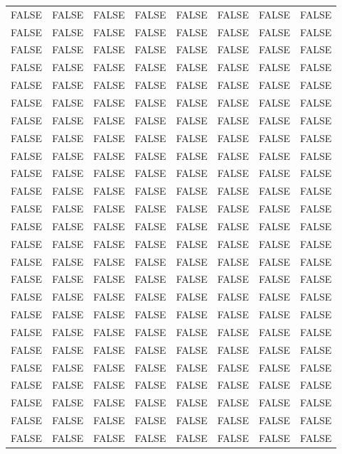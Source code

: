 \documentclass[11pt]{article}
\begin{document}
\begin{tabular}{llllllll}
	 FALSE & FALSE & FALSE & FALSE & FALSE & FALSE & FALSE & FALSE\\
	 FALSE & FALSE & FALSE & FALSE & FALSE & FALSE & FALSE & FALSE\\
	 FALSE & FALSE & FALSE & FALSE & FALSE & FALSE & FALSE & FALSE\\
	 FALSE & FALSE & FALSE & FALSE & FALSE & FALSE & FALSE & FALSE\\
	 FALSE & FALSE & FALSE & FALSE & FALSE & FALSE & FALSE & FALSE\\
	 FALSE & FALSE & FALSE & FALSE & FALSE & FALSE & FALSE & FALSE\\
	 FALSE & FALSE & FALSE & FALSE & FALSE & FALSE & FALSE & FALSE\\
	 FALSE & FALSE & FALSE & FALSE & FALSE & FALSE & FALSE & FALSE\\
	 FALSE & FALSE & FALSE & FALSE & FALSE & FALSE & FALSE & FALSE\\
	 FALSE & FALSE & FALSE & FALSE & FALSE & FALSE & FALSE & FALSE\\
	 FALSE & FALSE & FALSE & FALSE & FALSE & FALSE & FALSE & FALSE\\
	 FALSE & FALSE & FALSE & FALSE & FALSE & FALSE & FALSE & FALSE\\
	 FALSE & FALSE & FALSE & FALSE & FALSE & FALSE & FALSE & FALSE\\
	 FALSE & FALSE & FALSE & FALSE & FALSE & FALSE & FALSE & FALSE\\
	 FALSE & FALSE & FALSE & FALSE & FALSE & FALSE & FALSE & FALSE\\
	 FALSE & FALSE & FALSE & FALSE & FALSE & FALSE & FALSE & FALSE\\
	 FALSE & FALSE & FALSE & FALSE & FALSE & FALSE & FALSE & FALSE\\
	 FALSE & FALSE & FALSE & FALSE & FALSE & FALSE & FALSE & FALSE\\
	 FALSE & FALSE & FALSE & FALSE & FALSE & FALSE & FALSE & FALSE\\
	 FALSE & FALSE & FALSE & FALSE & FALSE & FALSE & FALSE & FALSE\\
	 FALSE & FALSE & FALSE & FALSE & FALSE & FALSE & FALSE & FALSE\\
	 FALSE & FALSE & FALSE & FALSE & FALSE & FALSE & FALSE & FALSE\\
	 FALSE & FALSE & FALSE & FALSE & FALSE & FALSE & FALSE & FALSE\\
	 FALSE & FALSE & FALSE & FALSE & FALSE & FALSE & FALSE & FALSE\\
	 FALSE & FALSE & FALSE & FALSE & FALSE & FALSE & FALSE & FALSE\\

\end{tabular}
\end{document}
